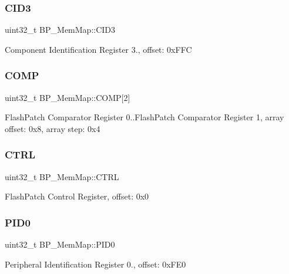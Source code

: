 \subsubsection{\texorpdfstring{C\+I\+D3}{CID3}}
{\footnotesize\ttfamily uint32\+\_\+t B\+P\+\_\+\+Mem\+Map\+::\+C\+I\+D3}

Component Identification Register 3., offset\+: 0x\+F\+FC \mbox{\label{struct_b_p___mem_map_ac8c266a109ad2f29683dfb7873b71974}} 
\subsubsection{\texorpdfstring{C\+O\+MP}{COMP}}
{\footnotesize\ttfamily uint32\+\_\+t B\+P\+\_\+\+Mem\+Map\+::\+C\+O\+MP\mbox{[}2\mbox{]}}

Flash\+Patch Comparator Register 0..Flash\+Patch Comparator Register 1, array offset\+: 0x8, array step\+: 0x4 \mbox{\label{struct_b_p___mem_map_adc78a44bcbb6564277efefa8f07439ce}} 
\subsubsection{\texorpdfstring{C\+T\+RL}{CTRL}}
{\footnotesize\ttfamily uint32\+\_\+t B\+P\+\_\+\+Mem\+Map\+::\+C\+T\+RL}

Flash\+Patch Control Register, offset\+: 0x0 \mbox{\label{struct_b_p___mem_map_acb1de7fb15f421c81ddfbf6feba0c4f2}} 
\subsubsection{\texorpdfstring{P\+I\+D0}{PID0}}
{\footnotesize\ttfamily uint32\+\_\+t B\+P\+\_\+\+Mem\+Map\+::\+P\+I\+D0}

Peripheral Identification Register 0., offset\+: 0x\+F\+E0 \mbox{\label{struct_b_p___mem_map_a2b27e33fff1d3730366050ede44cb7c3}} 
